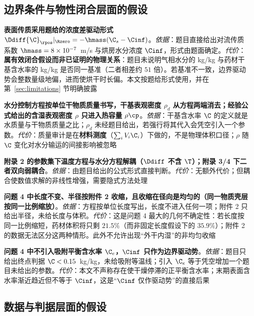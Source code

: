 \subsection{边界条件与物性闭合层面的假设}

\begin{assumptionlist}
\item[\textbf{A7}] \textbf{表面传质采用题给的浓度差驱动形式 $\Ddiff{\C}_\rpos|_{\Rzero}=-\hmass({\C}_s-\Cinf)$}。\emph{依据}：题目直接给出对流传质系数 $\hmass=8\times10^{-7}$~m/s 与烘房水分浓度 $\Cinf$，形式由题面确定。\emph{代价}：\textbf{属有效闭合假设而非已证明的物理关系}：题目未说明气相水分的 kg/kg 与药材干基含水率的 kg/kg 是否同一基准（二者相差约 $51$ 倍）。若基准不一致，边界驱动势会整数量级地偏，进而使烘干时长偏。本文按题给形式使用，并在第~\ref{sec:limitations} 节明确披露
\item[\textbf{A8}] \textbf{水分控制方程按\textbf{单位干物质质量}书写，干基表观密度 $\rho_d$ 从方程两端消去；经验公式给出的含湿表观密度 $\rho$ 只进入热容量 $\rho\cp$}。\emph{依据}：干基含水率 $\C$ 的定义就是水质量与干物质质量之比；$\rho_d$ 未经题目给出，若强行将其代入会凭空引入一个参数。\emph{代价}：质量审计是在\textbf{材料测度}（$\sum_i V_i{\C}_i$）下做的，不是物理体积口径；$\rho$ 随 $\C$ 变化对水分输运的间接影响被忽略
\item[\textbf{A9}] \textbf{附录 2 的参数集下温度方程与水分方程解耦（$\Ddiff$ 不含 $\T$）；附录 3/4 下二者双向弱耦合}。\emph{依据}：由题目给出的公式形式直接判断。\emph{代价}：无额外代价；但耦合使数值求解的非线性增强，需要隐式方法处理
\item[\textbf{A10}] \textbf{问题 4 中\textbf{长度不变、半径按附件 2 收缩}，且收缩在径向是\textbf{均匀}的（同一物质壳层按同一比例缩放）}。\emph{依据}：方程按单位长度写出，长度不进入任何一项；附件 2 只给出半径，未给长度与体积。\emph{代价}：这是问题 4 最大的几何不确定性：若长度按同一比例缩短，药材体积将只剩 $21.5\%$（而非固定长度假设下的 $35.9\%$）；附件 2 的数据无法区分这两种情形。此外不允许出现``外干内湿''的非均匀收缩
\item[\textbf{A11}] \textbf{问题 4 中\textbf{不引入吸附平衡含水率 ${\C}_e$}，$\Cinf$ 只作为边界驱动势}。\emph{依据}：题目只给出终点判据 $\C<0.15$~kg/kg，未给吸附等温线；引入 ${\C}_e$ 等于凭空增加一个题目未给出的参数。\emph{代价}：本文不声称存在使干燥停滞的正平衡含水率；末期表面含水率渐近趋近但不等于 $\Cinf$，这是``$\Cinf$ 仅作驱动势''的直接后果
\end{assumptionlist}

\subsection{数据与判据层面的假设}

